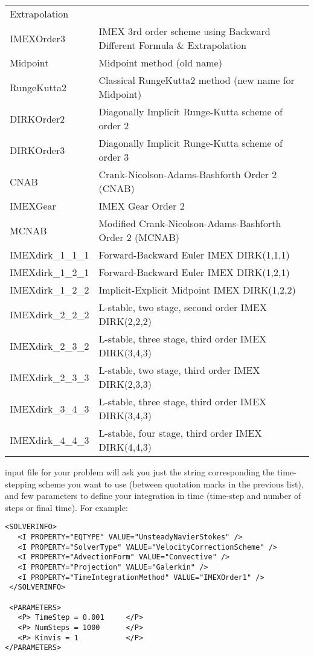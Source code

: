 \begin{center}
\begin{tabular}{p{4cm}p{10cm}}
                       Extrapolation\\
IMEXOrder3           & IMEX 3rd order scheme using Backward Different Formula \&
                       Extrapolation\\
Midpoint             & Midpoint method (old name)\\
RungeKutta2     & Classical RungeKutta2 method (new name for Midpoint)\\
DIRKOrder2           & Diagonally Implicit Runge-Kutta scheme of order 2\\
DIRKOrder3           & Diagonally Implicit Runge-Kutta scheme of order 3\\
CNAB                 & Crank-Nicolson-Adams-Bashforth Order 2 (CNAB)\\
IMEXGear             & IMEX Gear Order 2\\
MCNAB                & Modified Crank-Nicolson-Adams-Bashforth Order 2 (MCNAB)\\
IMEXdirk\_1\_1\_1    & Forward-Backward Euler IMEX DIRK(1,1,1)\\
IMEXdirk\_1\_2\_1    & Forward-Backward Euler IMEX DIRK(1,2,1)\\
IMEXdirk\_1\_2\_2    & Implicit-Explicit Midpoint IMEX DIRK(1,2,2)\\
IMEXdirk\_2\_2\_2    & L-stable, two stage, second order IMEX DIRK(2,2,2)\\
IMEXdirk\_2\_3\_2    & L-stable, three stage, third order IMEX DIRK(3,4,3)\\
IMEXdirk\_2\_3\_3    & L-stable, two stage, third order IMEX DIRK(2,3,3)\\
IMEXdirk\_3\_4\_3    & L-stable, three stage, third order IMEX DIRK(3,4,3)\\
IMEXdirk\_4\_4\_3    & L-stable, four stage, third order IMEX DIRK(4,4,3)\\
\bottomrule
\end{tabular}
\end{center}

{\nek} input file for your problem will ask you just the string corresponding
the time-stepping scheme you want to use (between quotation marks in the
previous list), and few parameters to define your integration in time (time-step
and number of steps or final time). For example:\\
\begin{lstlisting}[style=XMLStyle]
<SOLVERINFO>
   <I PROPERTY="EQTYPE" VALUE="UnsteadyNavierStokes" />
   <I PROPERTY="SolverType" VALUE="VelocityCorrectionScheme" />
   <I PROPERTY="AdvectionForm" VALUE="Convective" /> 
   <I PROPERTY="Projection" VALUE="Galerkin" /> 
   <I PROPERTY="TimeIntegrationMethod" VALUE="IMEXOrder1" />
 </SOLVERINFO>
 
 <PARAMETERS>
   <P> TimeStep = 0.001     </P> 
   <P> NumSteps = 1000      </P> 
   <P> Kinvis = 1           </P>
</PARAMETERS>
\end{lstlisting}


